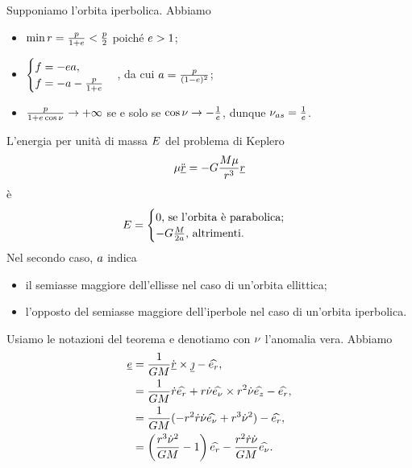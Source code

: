 \par Supponiamo l'orbita iperbolica. Abbiamo
\begin{itemize}
	\item $\min r = \frac{p}{1 + e} < \frac{p}{2}$ poich\'e $e > 1$;
	\item $\begin{cases}f = - e a,\\f =  - a - \frac{p}{1 + e}\end{cases}$, da cui $a = \frac{p}{(1 - e)^2}$;
	\item $\frac{p}{1 + e \cos{\nu}} \rightarrow + \infty$ se e solo se $\cos{\nu} \rightarrow - \frac{1}{e}$, dunque $\nu_{as} = \frac{1}{e}$. \EndProof
\end{itemize}
\begin{Theorem}
	L'energia per unit\`a di massa $E$ del problema di Keplero
	\[
		\mu \ddot{\underline{r}} = - G \frac{M\mu}{r^3}\underline{r}
	\]
	\`e
	\[
		E =
		\begin{cases}
			0\text{, se l'orbita \`e parabolica;}\\
			- G \frac{M}{2 a}\text{, altrimenti.}
		\end{cases}
	\]
	Nel secondo caso, $a$ indica
	\begin{itemize}
		\item il semiasse maggiore dell'ellisse nel caso di un'orbita ellittica;
		\item l'opposto del semiasse maggiore dell'iperbole nel caso di un'orbita iperbolica.
	\end{itemize}
\end{Theorem}
\par Usiamo le notazioni del teorema \label{ElementiDiMeccanicaCeleste_VettoreDiLenz} e denotiamo con $\nu$ l'anomalia vera. Abbiamo
\begin{align*}
	\underline{e}
	&= \frac{1}{GM} \dot{\underline{r}} \times \underline{\jmath} - \widehat{e_r},\\
	&= \frac{1}{GM} \dot{r}\widehat{e_r} + r\dot{\nu}\widehat{e_{\nu}} \times r^2\dot{\nu} \widehat{e_z} - \widehat{e_r},\\
	&= \frac{1}{GM} (- r^2 \dot{r} \dot{\nu} \widehat{e_\nu} + r^3 \dot{\nu}^2) - \widehat{e_r},\\
	&= \left ( \frac{r^3\dot{\nu}^2}{GM} - 1 \right ) \widehat{e_r} - \frac{r^2\dot{r}\dot{\nu}}{GM} \widehat{e_\nu}.
\end{align*}
